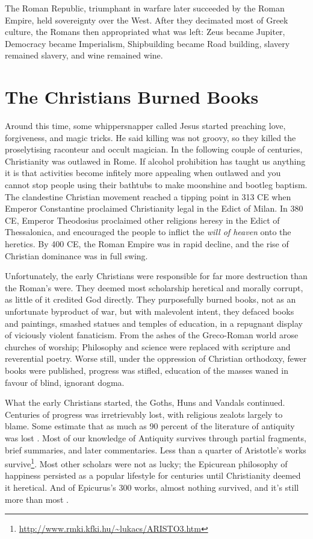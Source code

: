 The Roman Republic, triumphant in warfare later succeeded by the Roman Empire, held sovereignty over the West. After they decimated most of Greek culture, the Romans then appropriated what was left: Zeus became Jupiter, Democracy became Imperialism, Shipbuilding became Road building, slavery remained slavery, and wine remained wine.

\section{The Christians Burned Books}

Around this time, some whippersnapper called Jesus started preaching love, forgiveness, and magic tricks. He said killing was not groovy, so they killed the proselytising raconteur and occult magician. In the following couple of centuries, Christianity was outlawed in Rome. If alcohol prohibition has taught us anything it is that activities become infitely more appealing when outlawed and you cannot stop people using their bathtubs to make moonshine and bootleg baptism. The clandestine Christian movement reached a tipping point in 313 CE when Emperor Constantine proclaimed Christianity legal in the Edict of Milan. In 380 CE, Emperor Theodosius proclaimed other religions heresy in the Edict of Thessalonica, and encouraged the people to inflict the \textit{will of heaven} onto the heretics. By 400 CE, the Roman Empire was in rapid decline, and the rise of Christian dominance was in full swing.

Unfortunately, the early Christians were responsible for far more destruction than the Roman's were. They deemed most scholarship heretical and morally corrupt, as little of it credited God directly. They purposefully burned books, not as an unfortunate byproduct of war, but with malevolent intent, they defaced books and paintings, smashed statues and temples of education, in a repugnant display of viciously violent fanaticism. From the ashes of the Greco-Roman world arose churches of worship; Philosophy and science were replaced with scripture and reverential poetry. Worse still, under the oppression of Christian orthodoxy, fewer books were published, progress was stifled, education of the masses waned in favour of blind, ignorant dogma.

What the early Christians started, the Goths, Huns and Vandals continued. Centuries of progress was irretrievably lost, with religious zealots largely to blame. Some estimate that as much as 90 percent of the literature of antiquity was lost \cite{rohmann2016christianity}. Most of our knowledge of Antiquity survives through partial fragments, brief summaries, and later commentaries. Less than a quarter of Aristotle's works survive\footnote{\url{http://www.rmki.kfki.hu/~lukacs/ARISTO3.htm}}. Most other scholars were not as lucky; the Epicurean philosophy of happiness persisted as a popular lifestyle for centuries until Christianity deemed it heretical. And of Epicurus's 300 works, almost nothing survived, and it's still more than most \cite{kenny2010new}. 

